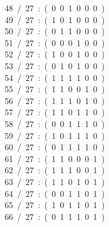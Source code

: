 \begin{tabbing}
48\ /\ 27\ :\ (\ 0\ 0\ 1\ 0\ 0\ 0\ )\\[0pt]
49\ /\ 27\ :\ (\ 1\ 0\ 1\ 0\ 0\ 0\ )\\[0pt]
50\ /\ 27\ :\ (\ 0\ 1\ 1\ 0\ 0\ 0\ )\\[0pt]
51\ /\ 27\ :\ (\ 0\ 0\ 0\ 1\ 0\ 0\ )\\[0pt]
52\ /\ 27\ :\ (\ 1\ 0\ 0\ 1\ 0\ 0\ )\\[0pt]
53\ /\ 27\ :\ (\ 0\ 1\ 0\ 1\ 0\ 0\ )\\[0pt]
54\ /\ 27\ :\ (\ 1\ 1\ 1\ 1\ 0\ 0\ )\\[0pt]
55\ /\ 27\ :\ (\ 1\ 1\ 0\ 0\ 1\ 0\ )\\[0pt]
56\ /\ 27\ :\ (\ 1\ 1\ 1\ 0\ 1\ 0\ )\\[0pt]
57\ /\ 27\ :\ (\ 1\ 1\ 0\ 1\ 1\ 0\ )\\[0pt]
58\ /\ 27\ :\ (\ 0\ 0\ 1\ 1\ 1\ 0\ )\\[0pt]
59\ /\ 27\ :\ (\ 1\ 0\ 1\ 1\ 1\ 0\ )\\[0pt]
60\ /\ 27\ :\ (\ 0\ 1\ 1\ 1\ 1\ 0\ )\\[0pt]
61\ /\ 27\ :\ (\ 1\ 1\ 0\ 0\ 0\ 1\ )\\[0pt]
62\ /\ 27\ :\ (\ 1\ 1\ 1\ 0\ 0\ 1\ )\\[0pt]
63\ /\ 27\ :\ (\ 1\ 1\ 0\ 1\ 0\ 1\ )\\[0pt]
64\ /\ 27\ :\ (\ 0\ 0\ 1\ 1\ 0\ 1\ )\\[0pt]
65\ /\ 27\ :\ (\ 1\ 0\ 1\ 1\ 0\ 1\ )\\[0pt]
66\ /\ 27\ :\ (\ 0\ 1\ 1\ 1\ 0\ 1\ )\\[0pt]

\end{tabbing}
